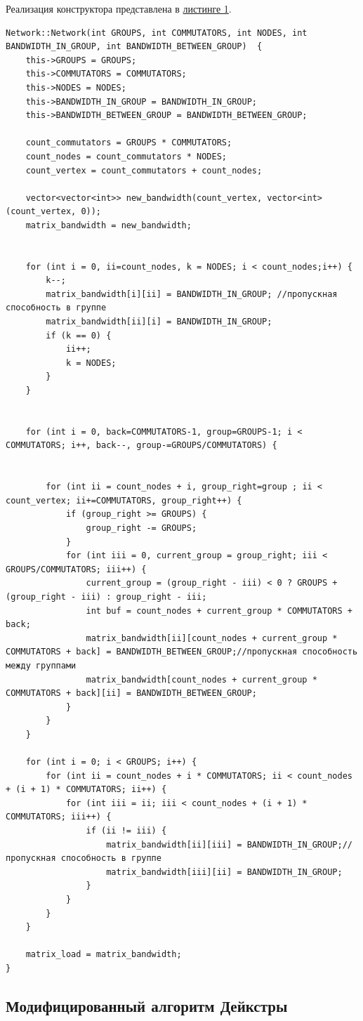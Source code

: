 \documentclass[11pt,a4paper,final]{article} %
\begin{document}
Реализация конструктора представлена в \hyperref[lst1]{листинге 1}.
\newpage
\begin{lstlisting}[label=lst1, caption = Конструктор класса Network]
Network::Network(int GROUPS, int COMMUTATORS, int NODES, int BANDWIDTH_IN_GROUP, int BANDWIDTH_BETWEEN_GROUP)  {
	this->GROUPS = GROUPS;
	this->COMMUTATORS = COMMUTATORS;
	this->NODES = NODES;
	this->BANDWIDTH_IN_GROUP = BANDWIDTH_IN_GROUP;
	this->BANDWIDTH_BETWEEN_GROUP = BANDWIDTH_BETWEEN_GROUP;
	
	count_commutators = GROUPS * COMMUTATORS; 
	count_nodes = count_commutators * NODES; 
	count_vertex = count_commutators + count_nodes;
	
	vector<vector<int>> new_bandwidth(count_vertex, vector<int>(count_vertex, 0));
	matrix_bandwidth = new_bandwidth;
	
	
	for (int i = 0, ii=count_nodes, k = NODES; i < count_nodes;i++) {
		k--;
		matrix_bandwidth[i][ii] = BANDWIDTH_IN_GROUP; //пропускная способность в группе
		matrix_bandwidth[ii][i] = BANDWIDTH_IN_GROUP;
		if (k == 0) {
			ii++;
			k = NODES;
		}	
	}
	
	
	for (int i = 0, back=COMMUTATORS-1, group=GROUPS-1; i < COMMUTATORS; i++, back--, group-=GROUPS/COMMUTATORS) {
		
		
		for (int ii = count_nodes + i, group_right=group ; ii < count_vertex; ii+=COMMUTATORS, group_right++) {
			if (group_right >= GROUPS) {
				group_right -= GROUPS;
			}
			for (int iii = 0, current_group = group_right; iii < GROUPS/COMMUTATORS; iii++) {
				current_group = (group_right - iii) < 0 ? GROUPS + (group_right - iii) : group_right - iii;
				int buf = count_nodes + current_group * COMMUTATORS + back; 
				matrix_bandwidth[ii][count_nodes + current_group * COMMUTATORS + back] = BANDWIDTH_BETWEEN_GROUP;//пропускная способность между группами
				matrix_bandwidth[count_nodes + current_group * COMMUTATORS + back][ii] = BANDWIDTH_BETWEEN_GROUP;
			}
		}
	}
	
	for (int i = 0; i < GROUPS; i++) {
		for (int ii = count_nodes + i * COMMUTATORS; ii < count_nodes + (i + 1) * COMMUTATORS; ii++) {
			for (int iii = ii; iii < count_nodes + (i + 1) * COMMUTATORS; iii++) {
				if (ii != iii) {
					matrix_bandwidth[ii][iii] = BANDWIDTH_IN_GROUP;//пропускная способность в группе
					matrix_bandwidth[iii][ii] = BANDWIDTH_IN_GROUP;
				}
			}
		}
	}
	
	matrix_load = matrix_bandwidth;
}
\end{lstlisting}

\subsection{Модифицированный алгоритм Дейкстры}
\end{document}
